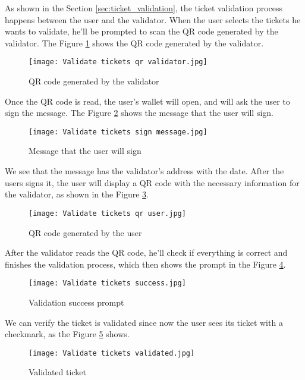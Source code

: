 As shown in the Section \ref{sec:ticket_validation}, the ticket validation
process happens between the user and the validator. When the user selects the
tickets he wants to validate, he'll be prompted to scan the QR code generated
by the validator. The Figure \ref{fig:validate_tickets_qr_validator} shows the
QR code generated by the validator.

\begin{figure}[H]
    \texttt{[image: Validate tickets qr validator.jpg]}
    \centering
    \caption{QR code generated by the validator}
    \label{fig:validate_tickets_qr_validator}
\end{figure}

Once the QR code is read, the user's wallet will open, and will ask the user to
sign the message. The Figure \ref{fig:validate_tickets_sign_message} shows the
message that the user will sign.

\begin{figure}[H]
    \texttt{[image: Validate tickets sign message.jpg]}
    \centering
    \caption{Message that the user will sign}
    \label{fig:validate_tickets_sign_message}
\end{figure}

We see that the message has the validator's address with the date. After the
users signs it, the user will display a QR code with the necessary information
for the validator, as shown in the Figure \ref{fig:validate_tickets_qr_user}.

\begin{figure}[H]
    \texttt{[image: Validate tickets qr user.jpg]}
    \centering
    \caption{QR code generated by the user}
    \label{fig:validate_tickets_qr_user}
\end{figure}

After the validator reads the QR code, he'll check if everything is correct and
finishes the validation process, which then shows the prompt in the Figure
\ref{fig:validate_tickets_success}.

\begin{figure}[H]
    \texttt{[image: Validate tickets success.jpg]}
    \centering
    \caption{Validation success prompt}
    \label{fig:validate_tickets_success}
\end{figure}

We can verify the ticket is validated since now the user sees its ticket with a
checkmark, as the Figure \ref{fig:validate_tickets_validated} shows.

\begin{figure}[H]
    \texttt{[image: Validate tickets validated.jpg]}
    \centering
    \caption{Validated ticket}
    \label{fig:validate_tickets_validated}
\end{figure}